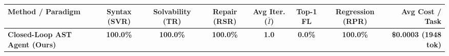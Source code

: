 \begin{tabular}{lccccccr}
\toprule
\textbf{Method / Paradigm} & \textbf{Syntax (SVR)} & \textbf{Solvability (TR)} & \textbf{Repair (RSR)} & \textbf{Avg Iter. ($\bar{I}$)} & \textbf{Top-1 FL} & \textbf{Regression (RPR)} & \textbf{Avg Cost / Task} \\
\midrule
\textbf{Closed-Loop AST Agent (Ours)} & \textbf{100.0\%} & \textbf{100.0\%} & \textbf{100.0\%} & \textbf{1.0} & \textbf{0.0\%} & \textbf{100.0\%} & \textbf{\$0.0003 (1948 tok)} \\
\bottomrule
\end{tabular}
